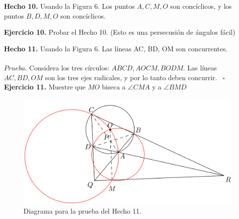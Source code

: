 \documentclass[11pt, a4paper]{article}
\begin{document}
\textbf{Hecho 10.} Usando la Figura 6. Los puntos $A,C,M,O$ son conc\'iclicos, y los puntos $B, D, M, O$ son conc\'iclicos.

\textbf{Ejercicio 10.} Probar el Hecho 10. (Esto es una persecusi\'on de \'angulos f\'acil)

\textbf{Hecho 11.} Usando la Figura 6. Las l\'ineas AC, BD, OM son concurrentes.
\\\\
$Prueba$. Considera los tres c\'irculos: $ABCD, AOCM, BODM$. Las l\'ineas $AC,BD,OM$ son los tres ejes radicales, y por lo tanto deben concurrir. \ $\square$
\newpage
\textbf{Ejercicio 11.} Muestre que $MO$ biseca a $\angle CMA$ y a $\angle BMD$
\begin{figure}[h]
	\centering
	\includegraphics[scale=0.3]{p6.2}
	\caption{Diagrama para la prueba del Hecho 11.}
\end{figure}
\end{document}
